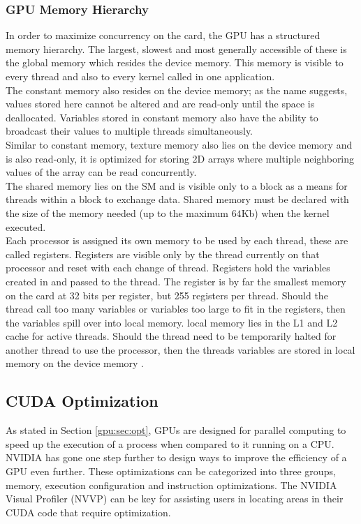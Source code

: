 \subsubsection{GPU Memory Hierarchy}\label{gpu:ssec:mem}
In order to maximize concurrency on the card, the GPU has a structured memory hierarchy. The largest, slowest and most generally accessible of these is the global memory which resides the device memory. This memory is visible to every thread and also to every kernel called in one application. 
\\
The constant memory also resides on the device memory; as the name suggests, values stored here cannot be altered and are read-only until the space is deallocated. Variables stored in constant memory also have the ability to broadcast their values to multiple threads simultaneously.
\\
Similar to constant memory, texture memory also lies on the device memory and is also read-only, it is optimized for storing 2D arrays where multiple neighboring values of the array can be read concurrently.
\\
The shared memory lies on the SM and is visible only to a block as a means for threads within a block to exchange data. Shared memory must be declared with the size of the memory needed (up to the maximum $64$Kb) when the kernel executed.
\\
Each processor is assigned its own memory to be used by each thread, these are called registers. Registers are visible only by the thread currently on that processor and reset with each change of thread. Registers hold the variables created in and passed to the thread. The register is by far the smallest memory on the card at 32 bits per register, but 255 registers per thread. Should the thread call too many variables or variables too large to fit in the registers, then the variables spill over into local memory. local memory lies in the L1 and L2 cache for active threads. Should the thread need to be temporarily halted for another thread to use the processor, then the threads variables are stored in local memory on the device memory \citep{CUDA}.
%
\subsection{CUDA Optimization}\label{gpu:sec:cop}
As stated in Section \ref{gpu:sec:opt}, GPUs are designed for parallel computing to speed up the execution of a process when compared to it running on a CPU. NVIDIA has gone one step further to design ways to improve the efficiency of a GPU even further. These optimizations can be categorized into three groups, memory, execution configuration and instruction optimizations. The NVIDIA Visual Profiler (NVVP) can be key for assisting users in locating areas in their CUDA code that require optimization.
